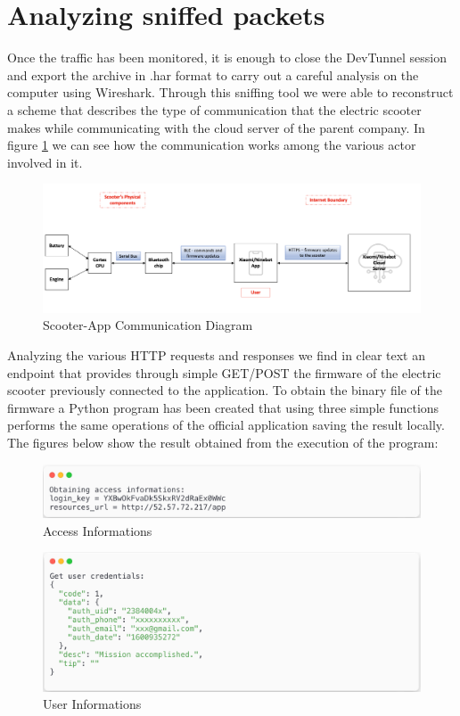 \documentclass[binding=0.6cm,LaM,noexaminfo]{sapthesis}
\begin{document}
\section{Analyzing sniffed packets}
Once the traffic has been monitored, it is enough to close the DevTunnel session and export the archive in .har format to carry out a careful analysis on the computer using Wireshark. 
Through this sniffing tool we were able to reconstruct a scheme that describes the type of communication that the electric scooter makes while communicating with the cloud server of the parent company. In figure \ref{fig:threat_model} we can see how the communication works among the various actor involved in it.
\begin{figure}[!htp]
    \centering
    \includegraphics[width = .9\textwidth]{images/sniffing_diagram.png}
    \caption{Scooter-App Communication Diagram}
    \label{fig:threat_model}
\end{figure}

\noindent Analyzing the various HTTP requests and responses we find in clear text an endpoint that provides through simple GET/POST the firmware of the electric scooter previously connected to the application. To obtain the binary file of the firmware a Python program has been created that using three simple functions performs the same operations of the official application saving the result locally. The figures below show the result obtained from the execution of the program:
\begin{figure}[!htp]
    \centering
    \includegraphics[width = .9\textwidth]{images/sniff1.png}
    \caption{Access Informations}
    \label{fig:my_label}
\end{figure}


\begin{figure}[!htp]
    \centering
    \includegraphics[width = .9\textwidth]{images/sniff2.png}
    \caption{User Informations}
    \label{fig:my_label}
\end{figure}
\end{document}
